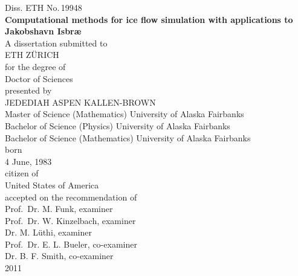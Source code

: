 \begin{titlepage}
  \begin{center}
    \large
    Diss. ETH No.\,19948\\
    \vspace{2.0cm} 
    \LARGE
    \textbf{
      Computational methods for ice flow simulation with applications to Jakobshavn Isbr{\ae}
    }
    \large
    \\    
    \vspace{1.5cm}
    A dissertation submitted to\\[0.5em]

    ETH Z\"URICH \\[2.0em]


    for the degree of \\[0.5em]

    Doctor of Sciences\\[3.0em]


    presented by \\[0.5em]

    JEDEDIAH ASPEN KALLEN-BROWN \\[0.5em]

    Master of Science (Mathematics) University of Alaska Fairbanks \\
    Bachelor of Science (Physics) University of Alaska Fairbanks \\
    Bachelor of Science (Mathematics) University of Alaska Fairbanks \\[2.0em]

    born\\[0.5em]
    4 June, 1983\\[2.0em]

    citizen of\\[0.5em]

    United States of America\\[3.0em]



    accepted on the recommendation of\\[1.0em]

    Prof.~Dr. M. Funk, examiner\\[0.5em]

    Prof.~Dr. W. Kinzelbach, examiner\\[0.5em]

    Dr. M. L\"uthi, examiner\\[0.5em]

    Prof.~Dr. E. L. Bueler, co-examiner\\[0.5em]

    Dr. B. F. Smith, co-examiner\\[5.0em]

    2011\\
  \end{center}
\end{titlepage}



